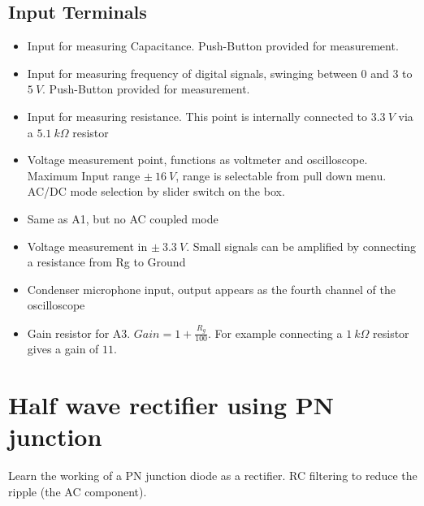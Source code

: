 \documentclass[a4paper,12pt,english]{sphinxmanual}
\begin{document}
\subsection{Input Terminals}
\label{\detokenize{3.1:input-terminals}}\begin{itemize}
\item {} 
 Input for measuring Capacitance. Push-Button provided for
measurement.

\item {} 
 Input for measuring frequency of digital signals, swinging
between \(0\) and \(3\) to \(5\ V\).
Push-Button provided for measurement.

\item {} 
 Input for measuring resistance. This point is internally
connected to \(3.3\ V\) via a \(5.1\ k\Omega\) resistor

\item {} 
 Voltage measurement point, functions as voltmeter and
oscilloscope. Maximum Input range \(\pm\ 16\ V\), range is selectable
from pull down menu. AC/DC mode selection by slider switch on the
box.

\item {} 
 Same as A1, but no AC coupled mode

\item {} 
 Voltage measurement in \(\pm\ 3.3\ V\). Small signals can
be amplified by connecting a resistance from Rg to Ground

\item {} 
 Condenser microphone input, output appears as the fourth
channel of the oscilloscope

\item {} 
 Gain resistor for A3. \(Gain = 1 + \frac{R_{g}}{100}\).
For example connecting a \(1\ k\Omega\) resistor gives a gain of
\(11\).

\end{itemize}


\section{Half wave rectifier using PN junction}
\label{\detokenize{3.2:half-wave-rectifier-using-pn-junction}}\label{\detokenize{3.2::doc}}

Learn the working of a PN junction diode as a rectifier. RC filtering to
reduce the ripple (the AC component).
\end{document}
